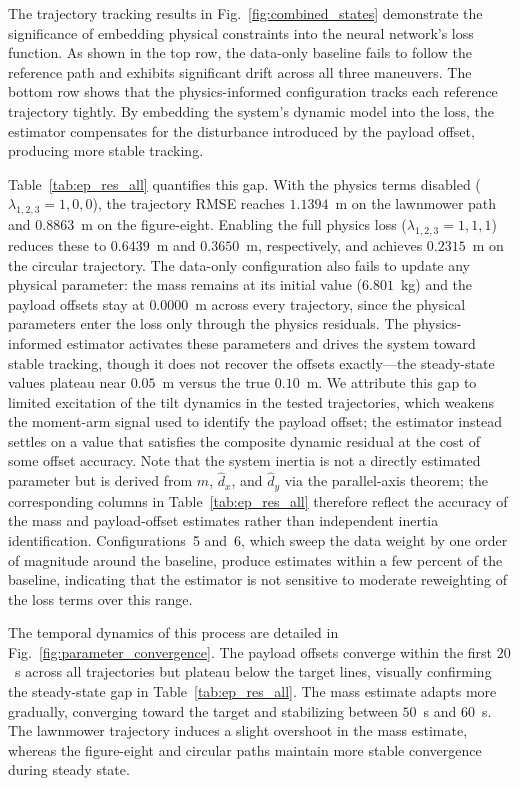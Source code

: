 The trajectory tracking results in Fig.~\ref{fig:combined_states} demonstrate
the significance of embedding physical constraints into the neural network's
loss function. As shown in the top row, the data-only baseline fails to follow
the reference path and exhibits significant drift across all three maneuvers.
The bottom row shows that the physics-informed configuration tracks each
reference trajectory tightly. By embedding the system's dynamic model into the
loss, the estimator compensates for the disturbance introduced by the payload
offset, producing more stable tracking.

Table~\ref{tab:ep_res_all} quantifies this gap. With the physics terms disabled
($\lambda_{1,2,3} = 1,0,0$), the trajectory RMSE reaches $1.1394$~m on the
lawnmower path and $0.8863$~m on the figure-eight. Enabling the full physics
loss ($\lambda_{1,2,3} = 1,1,1$) reduces these to $0.6439$~m and $0.3650$~m,
respectively, and achieves $0.2315$~m on the circular trajectory. The data-only
configuration also fails to update any physical parameter: the mass remains at
its initial value ($6.801$~kg) and the payload offsets stay at $0.0000$~m
across every trajectory, since the physical parameters enter the loss only
through the physics residuals. The physics-informed estimator activates these
parameters and drives the system toward stable tracking, though it does not
recover the offsets exactly---the steady-state values plateau near
$0.05$~m versus the true $0.10$~m. We attribute this gap to limited excitation
of the tilt dynamics in the tested trajectories, which weakens the moment-arm
signal used to identify the payload offset; the estimator instead settles on a
value that satisfies the composite dynamic residual at the cost of some offset
accuracy. Note that the system inertia is not a directly estimated parameter
but is derived from $\hat{m}$, $\hat{d}_x$, and $\hat{d}_y$ via the
parallel-axis theorem; the corresponding columns in
Table~\ref{tab:ep_res_all} therefore reflect the accuracy of the mass and
payload-offset estimates rather than independent inertia identification.
Configurations~5 and~6, which sweep the data weight by one order of magnitude
around the baseline, produce estimates within a few percent of the baseline,
indicating that the estimator is not sensitive to moderate reweighting of the
loss terms over this range.

The temporal dynamics of this process are detailed in
Fig.~\ref{fig:parameter_convergence}. The payload offsets converge within the
first $20$~s across all trajectories but plateau below the target lines,
visually confirming the steady-state gap in Table~\ref{tab:ep_res_all}. The
mass estimate adapts more gradually, converging toward the target and
stabilizing between $50$~s and $60$~s. The lawnmower trajectory induces a
slight overshoot in the mass estimate, whereas the figure-eight and circular
paths maintain more stable convergence during steady state.

